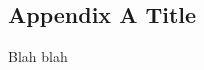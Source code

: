\documentclass[10pt]{ucthesis}
\begin{document}
\makeatletter
{}
\makeatother


\begin{appendices}
\chapter{Appendix A Title} \label{Appendix A}

Blah blah

\end{appendices}


\end{document}
